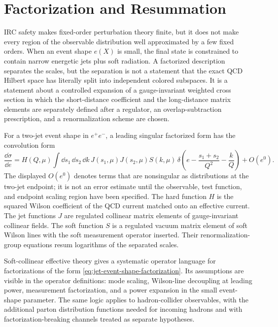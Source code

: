 \section{Factorization and Resummation}

IRC safety makes fixed-order perturbation theory finite, but it does not make
every region of the observable distribution well approximated by a few fixed
orders.  When an event shape \(e(X)\) is small, the final state is constrained
to contain narrow energetic jets plus soft radiation.  A factorized
description separates the scales, but the separation is not a statement that
the exact QCD Hilbert space has literally split into independent colored
subspaces.  It is a statement about a controlled expansion of a
gauge-invariant weighted cross section in which the short-distance coefficient
and the long-distance matrix elements are separately defined after a regulator,
an overlap-subtraction prescription, and a renormalization scheme are chosen.

For a two-jet event shape in \(e^+e^-\), a leading singular factorized form has
the convolution form
\begin{equation}
  \frac{\dd\sigma}{\dd e}
  =
  H(Q,\mu)
  \int \dd s_1\,\dd s_2\,\dd k\,
  J(s_1,\mu)J(s_2,\mu)S(k,\mu)\,
  \delta\!\left(e-\frac{s_1+s_2}{Q^2}-\frac{k}{Q}\right)
  +
  O(e^0).
  \label{eq:jet-event-shape-factorization}
\end{equation}
The displayed \(O(e^0)\) denotes terms that are nonsingular as distributions at
the two-jet endpoint; it is not an error estimate until the observable, test
function, and endpoint scaling region have been specified.  The hard function
\(H\) is the squared Wilson coefficient of the QCD current matched onto an
effective current.  The jet functions \(J\) are regulated collinear matrix
elements of gauge-invariant collinear fields.  The soft function \(S\) is a
regulated vacuum matrix element of soft Wilson lines with the soft measurement
operator inserted.  Their renormalization-group equations resum logarithms of
the separated scales.

Soft-collinear effective theory gives a systematic operator language for
factorizations of the form
\eqref{eq:jet-event-shape-factorization}.  Its assumptions are visible in the
operator definitions: mode scaling, Wilson-line decoupling at leading power,
measurement factorization, and a power expansion in the small event-shape
parameter.  The same logic applies to hadron-collider observables, with the
additional parton distribution functions needed for incoming hadrons and with
factorization-breaking channels treated as separate hypotheses.

